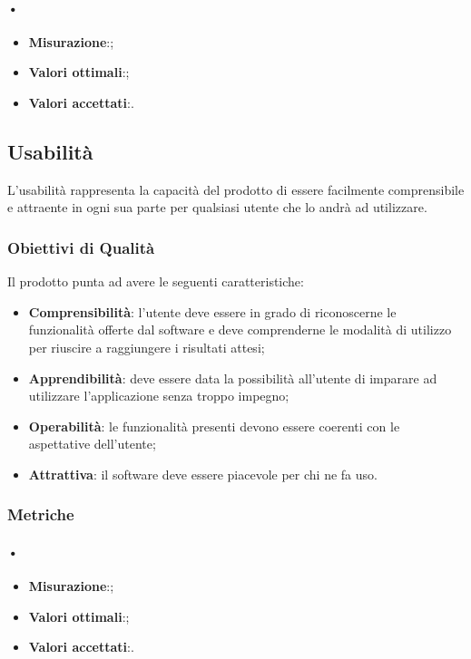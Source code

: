 \paragraph{•}
\begin{itemize}
\item \textbf{Misurazione}:;
\item \textbf{Valori ottimali}:;
\item \textbf{Valori accettati}:.
\end{itemize}

\subsection{Usabilità}
L’usabilità rappresenta la capacità del prodotto di essere facilmente comprensibile e attraente in ogni sua parte per qualsiasi utente che lo andrà ad utilizzare.

\subsubsection{Obiettivi di Qualità}
Il prodotto punta ad avere le seguenti caratteristiche:
\begin{itemize}
\item \textbf{Comprensibilità}: l'utente deve essere in grado di riconoscerne le funzionalità offerte dal software e deve comprenderne le modalità di utilizzo per riuscire a raggiungere i risultati attesi;
\item \textbf{Apprendibilità}: deve essere data la possibilità all'utente di imparare ad utilizzare l'applicazione senza troppo impegno;
\item \textbf{Operabilità}: le funzionalità presenti devono essere coerenti con le aspettative dell'utente;
\item \textbf{Attrattiva}: il software deve essere piacevole per chi ne fa uso.
\end{itemize}

\subsubsection{Metriche}

\paragraph{•}
\begin{itemize}
\item \textbf{Misurazione}:;
\item \textbf{Valori ottimali}:;
\item \textbf{Valori accettati}:.
\end{itemize}

